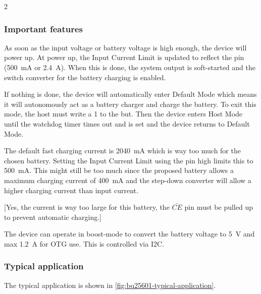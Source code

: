 \documentclass[11px]{specification}
\begin{document}
\begin{multicols}{2}
\subsubsection{Important features}
As soon as the input voltage or battery voltage is high enough, the device will power up. At power up, the Input Current Limit is updated to reflect the  pin (\qty{500}{\milli\ampere} or \qty{2.4}{\ampere}). When this is done, the system output \sig{} is soft-started and the switch converter for the battery charging is enabled.

If nothing is done, the device will automatically enter Default Mode which means it will autonomously act as a battery charger and charge the battery. To exit this mode, the host must write a 1 to the  but. Then the device enters Host Mode until the watchdog timer times out and  is set and the device returns to Default Mode.

The default fast charging current  is \qty{2040}{\milli\ampere} which is way too much for the chosen battery. Setting the Input Current Limit  using the pin  high limits this to \qty{500}{\milli\ampere}. This might still be too much since the proposed battery allows a maximum charging current of \qty{400}{\milli\ampere} and the step-down converter will allow a higher charging current than input current.

[Yes, the current is way too large for this battery, the $\bar{CE}$ pin must be pulled up to prevent automatic charging.]


The device can operate in boost-mode to convert the battery voltage to \qty{5}{\volt} and max \qty{1.2}{\ampere} for OTG use. This is controlled via I2C.



\end{multicols}

\subsubsection{Typical application}
The typical application is shown in \ref{fig:bq25601-typical-application}.
\end{document}
